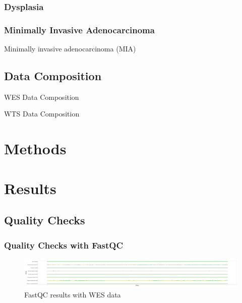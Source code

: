 \documentclass[11pt,a4paper,onecolumn,oneside]{report}
\begin{document}
            \subsubsection{Dysplasia}

            \subsubsection{Minimally Invasive Adenocarcinoma}
                Minimally invasive adenocarcinoma (MIA)

        \subsection{Data Composition}
            \begin{table}[p]
                \centering
                \label{tb:WES-composition}
                \caption{WES Data Composition}
                
            \end{table}

            \begin{table}[p]
                \centering
                \label{tb:WTS-composition}
                \caption{WTS Data Composition}
                
            \end{table}
    \pagebreak

    \section{Methods}

    \section{Results}
        \subsection{Quality Checks}
            \subsubsection{Quality Checks with FastQC}
                \begin{figure}[p]
                    \centering
                    \includegraphics[width=0.8 \linewidth]{figures/FastQC/FastQC_WES.pdf}
                    \caption{FastQC results with WES data}
                    \label{fig:fastqc-WES}
                \end{figure}
\end{document}
